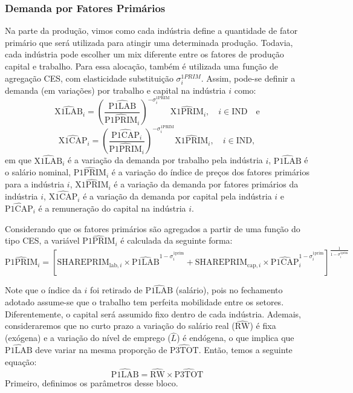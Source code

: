 \documentclass[12pt,twoside]{article}
\begin{document}
\hypertarget{demanda-por-fatores-primuxe1rios}{%
\subsubsection{Demanda por Fatores
Primários}\label{demanda-por-fatores-primuxe1rios}}

Na parte da produção, vimos como cada indústria define a quantidade de
fator primário que será utilizada para atingir uma determinada produção.
Todavia, cada indústria pode escolher um mix diferente entre os fatores
de produção capital e trabalho. Para essa alocação, também é utilizada
uma função de agregação CES, com elasticidade substituição
\(\sigma^{1PRIM}_i\). Assim, pode-se definir a demanda (em variações)
por trabalho e capital na indústria \(i\) como:
\[\hat{\text{X1LAB}}_i = \left(\frac{\hat{\text{P1LAB}}}{\hat{\text{P1PRIM}}_i}\right)^{-\sigma_i^{\text{1PRIM}}}\hat{\text{X1PRIM}}_i, \quad i \in \text{IND} \quad \text{e}\]
\[\hat{\text{X1CAP}}_i = \left(\frac{\hat{\text{P1CAP}}_i}{\hat{\text{P1PRIM}}_i}\right)^{-\sigma_i^{\text{1PRIM}}}\hat{\text{X1PRIM}}_i, \quad i \in \text{IND},\]
em que \(\hat{\text{X1LAB}}_i\) é a variação da demanda por trabalho
pela indústria \(i\), \(\hat{\text{P1LAB}}\) é o salário nominal,
\(\hat{\text{P1PRIM}}_i\) é a variação do índice de preços dos fatores
primários para a indústria \(i\), \(\hat{\text{X1PRIM}}_i\) é a variação
da demanda por fatores primários da indústria \(i\),
\(\hat{\text{X1CAP}}_i\) é a variação da demanda por capital pela
indústria \(i\) e \(\hat{\text{P1CAP}}_i\) é a remuneração do capital na
indústria \(i\).

Considerando que os fatores primários são agregados a partir de uma
função do tipo CES, a variável \(\hat{\text{P1PRIM}}_i\) é calculada da
seguinte forma:
\[\hat{\text{P1PRIM}}_i = \left[\text{SHAREPRIM}_{\text{lab},i}\times \hat{\text{P1LAB}}^{1 - \sigma_i^{\text{1prim}}} + \text{SHAREPRIM}_{\text{cap},i}\times \hat{\text{P1CAP}}^{1 - \sigma_i^{\text{1prim}}}_i\right]^\frac{1}{1 - \sigma_i^{\text{1prim}}}\]

Note que o índice da \(i\) foi retirado de \(\hat{\text{P1LAB}}\)
(salário), pois no fechamento adotado assume-se que o trabalho tem
perfeita mobilidade entre os setores. Diferentemente, o capital será
assumido fixo dentro de cada indústria. Ademais, consideraremos que no
curto prazo a variação do salário real (\(\hat{\text{RW}}\)) é fixa
(exógena) e a variação do nível de emprego (\(\hat{L}\)) é endógena, o
que implica que \(\hat{\text{P1LAB}}\) deve variar na mesma proporção de
\(\hat{\text{P3TOT}}\). Então, temos a seguinte equação:
\[\hat{\text{P1LAB}} = \hat{\text{RW}} \times \hat{\text{P3TOT}}\]
Primeiro, definimos os parâmetros desse bloco.
\end{document}
